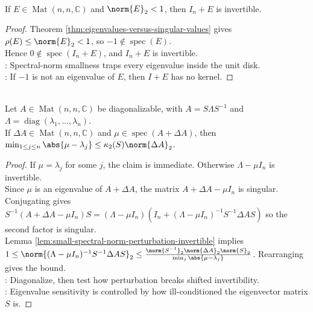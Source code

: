 \begin{lemma} \label{lem:small-spectral-norm-perturbation-invertible} \\
If $E\in\operatorname{Mat}(n,n,\mathbb{C})$ and $\norm{E}_2<1$, then $I_n+E$ is invertible.
\begin{proof}
Theorem \ref{thm:eigenvalues-versus-singular-values} gives $\rho(E)\leq\norm{E}_2<1$, so $-1\notin\operatorname{spec}(E)$.\\
Hence $0\notin\operatorname{spec}(I_n+E)$, and $I_n+E$ is invertible.\\
: Spectral-norm smallness traps every eigenvalue inside the unit disk.\\
: If $-1$ is not an eigenvalue of $E$, then $I+E$ has no kernel.
\end{proof}
\end{lemma}

\begin{theorem} \label{thm:bauer-fike-eigenvalue-perturbation} \\
Let $A\in\operatorname{Mat}(n,n,\mathbb{C})$ be diagonalizable, with $A=S\Lambda S^{-1}$ and $\Lambda=\operatorname{diag}(\lambda_1,\ldots,\lambda_n)$.\\
If $\Delta A\in\operatorname{Mat}(n,n,\mathbb{C})$ and $\mu\in\operatorname{spec}(A+\Delta A)$, then $\min_{1\leq j\leq n}\abs{\mu-\lambda_j} \leq \kappa_2(S)\norm{\Delta A}_2$.
\begin{proof}
If $\mu=\lambda_j$ for some $j$, the claim is immediate. Otherwise $\Lambda-\mu I_n$ is invertible.\\
Since $\mu$ is an eigenvalue of $A+\Delta A$, the matrix $A+\Delta A-\mu I_n$ is singular.\\
Conjugating gives $S^{-1}(A+\Delta A-\mu I_n)S =(\Lambda-\mu I_n)\left(I_n+(\Lambda-\mu I_n)^{-1}S^{-1}\Delta AS\right)$ so the second factor is singular.\\
Lemma \ref{lem:small-spectral-norm-perturbation-invertible} implies $1\leq \norm{(\Lambda-\mu I_n)^{-1}S^{-1}\Delta AS}_2 \leq \frac{\norm{S^{-1}}_2\norm{\Delta A}_2\norm{S}_2}{\min_j\abs{\mu-\lambda_j}}$.
Rearranging gives the bound.\\
: Diagonalize, then test how perturbation breaks shifted invertibility.\\
: Eigenvalue sensitivity is controlled by how ill-conditioned the eigenvector matrix $S$ is.
\end{proof}
\end{theorem}

